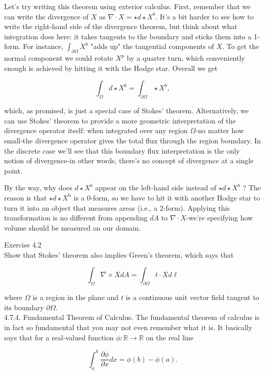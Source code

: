 \documentclass[10pt]{article}
\begin{document}
Let's try writing this theorem using exterior calculus. First, remember that we can write the divergence of $X$ as $\nabla \cdot X=\star d \star X^{b}$. It's a bit harder to see how to write the right-hand side of the divergence theorem, but think about what integration does here: it takes tangents to the boundary and sticks them into a 1-form. For instance, $\int_{\partial \Omega} X^{b}$ "adds up" the tangential components of $X$. To get the normal component we could rotate $X^{p}$ by a quarter turn, which conveniently enough is achieved by hitting it with the Hodge star. Overall we get

$$
\int_{\Omega} d \star X^{b}=\int_{\partial \Omega} \star X^{b},
$$

which, as promised, is just a special case of Stokes' theorem. Alternatively, we can use Stokes' theorem to provide a more geometric interpretation of the divergence operator itself: when integrated over any region $\Omega$-no matter how small-the divergence operator gives the total flux through the region boundary. In the discrete case we'll see that this boundary flux interpretation is the only notion of divergence-in other words, there's no concept of divergence at a single point.

By the way, why does $d \star X^{b}$ appear on the left-hand side instead of $\star d \star X^{b}$ ? The reason is that $\star d \star X^{\mathrm{b}}$ is a 0-form, so we have to hit it with another Hodge star to turn it into an object that measures areas (i.e., a 2-form). Applying this transformation is no different from appending $d A$ to $\nabla \cdot X$-we're specifying how volume should be measured on our domain.

Exercise 4.2\\
Show that Stokes' theorem also implies Green's theorem, which says that

$$
\int_{\Omega} \nabla \times X d A=\int_{\partial \Omega} t \cdot X d \ell
$$

where $\Omega$ is a region in the plane and $t$ is a continuous unit vector field tangent to its boundary $\partial \Omega$.\\
4.7.4. Fundamental Theorem of Calculus. The fundamental theorem of calculus is in fact so fundamental that you may not even remember what it is. It basically says that for a real-valued function $\phi: \mathbb{R} \rightarrow \mathbb{R}$ on the real line

$$
\int_{a}^{b} \frac{\partial \phi}{\partial x} d x=\phi(b)-\phi(a) .
$$
\end{document}
